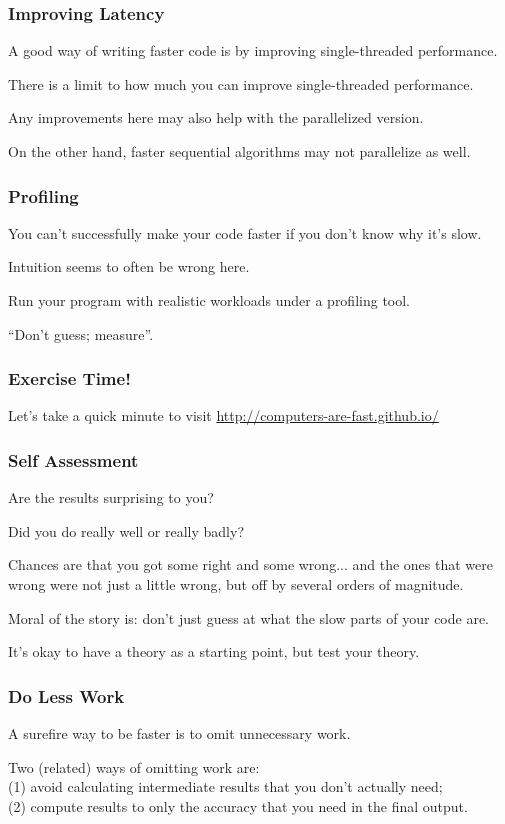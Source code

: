 \begin{frame}
\frametitle{Improving Latency}

A good way of writing faster code is by improving single-threaded 
performance. 

There is a limit to how much you can
improve single-threaded performance.

Any improvements here
may also help with the parallelized version. 

On the other hand, faster
sequential algorithms may not parallelize as well. 


\end{frame}




\begin{frame}
\frametitle{Profiling}


You can't successfully make your code 
faster if you don't know why it's slow. 

Intuition seems to often be
wrong here. 

Run your program with realistic workloads under a profiling tool.

``Don't guess; measure''.

\end{frame}


\begin{frame}
\frametitle{Exercise Time!}

Let's take a quick minute to visit \url{http://computers-are-fast.github.io/} 

\end{frame}

\begin{frame}
\frametitle{Self Assessment}

Are the results surprising to you? 

Did you do really well or really badly? 

Chances are that you got some right and some wrong... and the ones that were wrong were not just a little wrong, but off by several orders of magnitude. 

Moral of the story is: don't just guess at what the slow parts of your code are. 

It's okay to have a theory as a starting point, but test your theory.

\end{frame}

\begin{frame}
\frametitle{Do Less Work}

A surefire way to be faster is to omit unnecessary
work. 

Two (related) ways of omitting work are:\\
\quad (1) avoid calculating intermediate results that you don't actually need;\\
\quad (2) compute results to only the accuracy that you need in the final output.


\end{frame}

